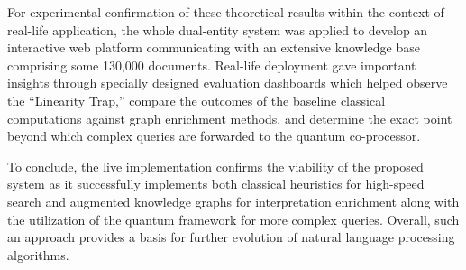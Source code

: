 For experimental confirmation of these theoretical results within the context of real-life application, the whole dual-entity system was applied to develop an interactive web platform communicating with an extensive knowledge base comprising some 130,000 documents. Real-life deployment gave important insights through specially designed evaluation dashboards which helped observe the “Linearity Trap,” compare the outcomes of the baseline classical computations against graph enrichment methods, and determine the exact point beyond which complex queries are forwarded to the quantum co-processor.

To conclude, the live implementation confirms the viability of the proposed system as it successfully implements both classical heuristics for high-speed search and augmented knowledge graphs for interpretation enrichment along with the utilization of the quantum framework for more complex queries. Overall, such an approach provides a basis for further evolution of natural language processing algorithms.